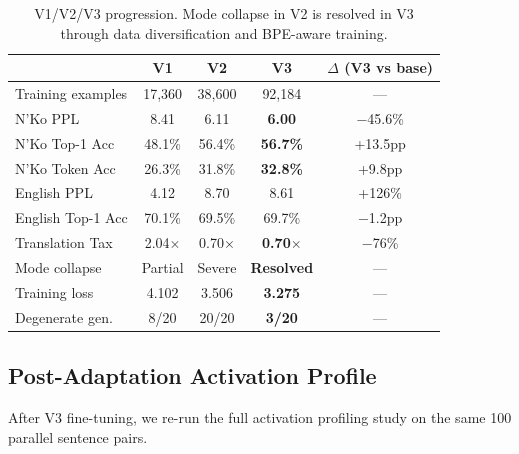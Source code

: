 \documentclass[11pt]{article}
\begin{document}
\begin{table}[t]
\centering
\small
\begin{tabular}{lcccc}
\toprule
& \textbf{V1} & \textbf{V2} & \textbf{V3} & \textbf{$\Delta$ (V3 vs base)} \\
\midrule
Training examples & 17,360 & 38,600 & 92,184 & --- \\
N'Ko PPL & 8.41 & 6.11 & \textbf{6.00} & $-$45.6\% \\
N'Ko Top-1 Acc & 48.1\% & 56.4\% & \textbf{56.7\%} & +13.5pp \\
N'Ko Token Acc & 26.3\% & 31.8\% & \textbf{32.8\%} & +9.8pp \\
English PPL & 4.12 & 8.70 & 8.61 & +126\% \\
English Top-1 Acc & 70.1\% & 69.5\% & 69.7\% & $-$1.2pp \\
Translation Tax & 2.04$\times$ & 0.70$\times$ & \textbf{0.70$\times$} & $-$76\% \\
Mode collapse & Partial & Severe & \textbf{Resolved} & --- \\
Training loss & 4.102 & 3.506 & \textbf{3.275} & --- \\
Degenerate gen. & 8/20 & 20/20 & \textbf{3/20} & --- \\
\bottomrule
\end{tabular}
\caption{V1/V2/V3 progression. Mode collapse in V2 is resolved in V3 through data diversification and BPE-aware training.}
\label{tab:v123-progression}
\end{table}

\subsection{Post-Adaptation Activation Profile}

After V3 fine-tuning, we re-run the full activation profiling study on the same 100 parallel sentence pairs.
\end{document}
